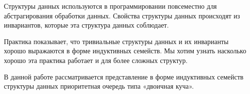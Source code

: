 \startprefacepage

Структуры данных используются в программировании повсеместно для
абстрагирования обработки данных.
Свойства структуры данных происходят из инвариантов, которые эта структура
данных соблюдает.

Практика показывает, что тривиальные структуры данных и их инварианты
хорошо выражаются в форме индуктивных семейств.
Мы хотим узнать насколько хорошо эта практика работает и для более сложных структур.

В данной работе рассматривается представление в форме индуктивных семейств
структуры данных приоритетная очередь типа «двоичная куча».

